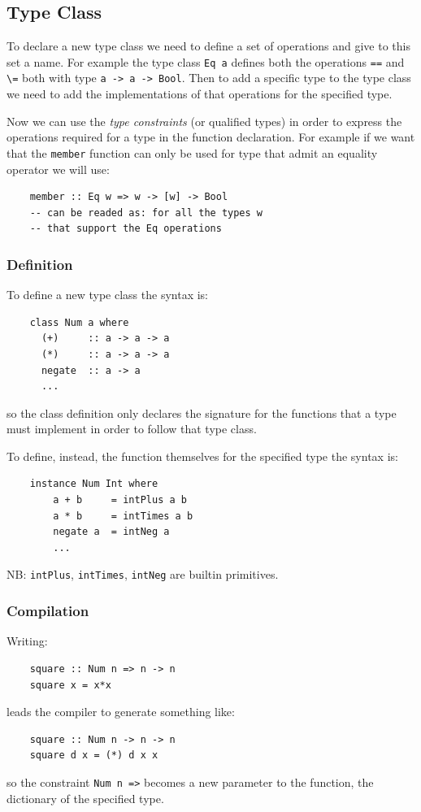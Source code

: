 \subsection{Type Class}
To declare a new type class we need to define a set of operations and give to this set a name.
For example the type class \verb|Eq a| defines both the operations \verb|==| and \verb|\=| both with type \verb|a -> a -> Bool|.
Then to add a specific type to the type class we need to add the implementations of that operations for the specified type.

Now we can use the \emph{type constraints} (or qualified types) in order to express the operations required for a type in the function declaration.
For example if we want that the \verb|member| function can only be used for type that admit an equality operator we will use:
\begin{verbatim}
    member :: Eq w => w -> [w] -> Bool
    -- can be readed as: for all the types w
    -- that support the Eq operations
\end{verbatim}

\subsubsection{Definition}
To define a new type class the syntax is:
\begin{verbatim}
    class Num a where
      (+)     :: a -> a -> a
      (*)     :: a -> a -> a
      negate  :: a -> a
      ...
\end{verbatim}
so the class definition only declares the signature for the functions that a type must implement in order to follow that type class.

To define, instead, the function themselves for the specified type the syntax is:
\begin{verbatim}
    instance Num Int where
        a + b     = intPlus a b
        a * b     = intTimes a b
        negate a  = intNeg a
        ...
\end{verbatim}

NB: \verb|intPlus|, \verb|intTimes|, \verb|intNeg| are builtin primitives.

\subsubsection{Compilation}
Writing:
\begin{verbatim}
    square :: Num n => n -> n
    square x = x*x
\end{verbatim}
leads the compiler to generate something like:
\begin{verbatim}
    square :: Num n -> n -> n
    square d x = (*) d x x
\end{verbatim}
so the constraint \verb|Num n =>| becomes a new parameter to the function, the dictionary of the specified type.

